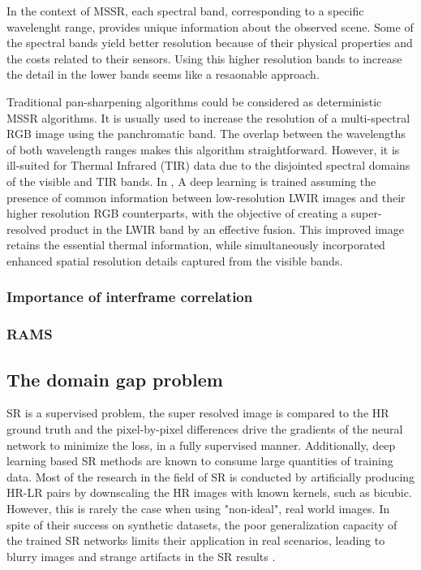         In the context of MSSR, each spectral band, corresponding to a specific wavelenght range, provides unique information about the observed scene. Some of the spectral bands yield better resolution because of their physical properties and the costs related to their sensors. Using this higher resolution bands to increase the detail in the lower bands seems like a resaonable approach.

        Traditional pan-sharpening algorithms could be considered as deterministic MSSR  algorithms. It is usually used to increase the resolution of a multi-spectral RGB image using the panchromatic band. The overlap between the wavelengths of both wavelength ranges makes this algorithm straightforward. However, it is ill-suited for Thermal Infrared (TIR) data due to the disjointed spectral domains of the visible and TIR bands. In \cite{myself2023}, A deep learning is trained assuming the presence of common information between low-resolution LWIR images and their higher resolution RGB counterparts, with the objective of creating a super-resolved product in the LWIR band by an effective fusion. This improved image retains the essential thermal information, while simultaneously incorporated enhanced spatial resolution details captured from the visible bands. 

        \subsubsection{Importance of interframe correlation}
        \subsubsection{RAMS}
    \subsection{The domain gap problem} \label{subsec:domaingap}
 
        SR is a supervised problem, the super resolved image is compared to the HR ground truth and the pixel-by-pixel differences drive the gradients of the neural network to minimize the loss, in a fully supervised manner. 
        Additionally, deep learning based SR methods are known to consume large quantities of training data.
        Most of the research in the field of SR is conducted by artificially producing HR-LR pairs by downscaling the HR images with known kernels, such as bicubic.
        However, this is rarely the case when using "non-ideal", real world images.
        In spite of their success on synthetic datasets, the poor generalization capacity of the trained SR networks limits their application in real scenarios, leading to blurry images and strange artifacts in the SR results \cite{lugmayr2020ntire}.



